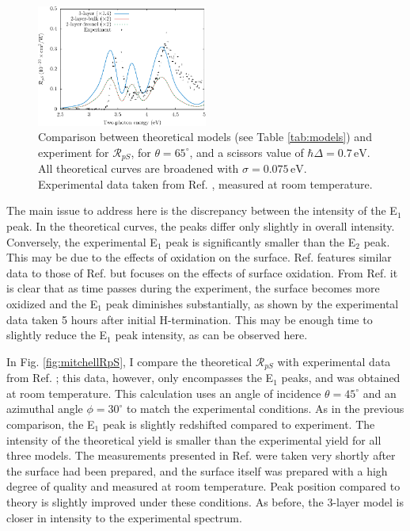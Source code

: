 \begin{figure}[H]
\centering
\includegraphics[width=0.5\textwidth]{content/figures/fig-4_4_01}
\caption{Comparison between theoretical models (see Table \ref{tab:models}) and
experiment for $\mathcal{R}_{pS}$, for $\theta=65^{\circ}$, and a scissors
value of $\hbar\Delta = 0.7\,\text{eV}$. All theoretical curves are broadened
with $\sigma=0.075\,\text{eV}$. Experimental data taken from Ref.
\cite{mejiaPRB02}, measured at room temperature.}
\label{fig:RpS}
\end{figure}

The main issue to address here is the discrepancy between the intensity of the
E$_{1}$ peak. In the theoretical curves, the peaks differ only slightly in
overall intensity. Conversely, the experimental E$_{1}$ peak is significantly
smaller than the E$_{2}$ peak. This may be due to the effects of oxidation on
the surface. Ref. \cite{bergfeldPRL04} features similar data to those of Ref.
\cite{mejiaPRB02} but focuses on the effects of surface oxidation. From Ref.
\cite{bergfeldPRL04} it is clear that as time passes during the experiment, the
surface becomes more oxidized and the E$_{1}$ peak diminishes substantially, as
shown by the experimental data taken 5 hours after initial H-termination. This
may be enough time to slightly reduce the E$_{1}$ peak intensity, as can be
observed here.

In Fig. \ref{fig:mitchellRpS}, I compare the theoretical $\mathcal{R}_{pS}$ with
experimental data from Ref. \cite{mitchellSS01}; this data, however, only
encompasses the E$_{1}$ peaks, and was obtained at room temperature. This
calculation uses an angle of incidence $\theta=45^\circ$ and an azimuthal angle
$\phi=30^\circ$ to match the experimental conditions. As in the previous
comparison, the E$_{1}$ peak is slightly redshifted compared to experiment. The
intensity of the theoretical yield is smaller than the experimental yield for
all three models. The measurements presented in Ref. \cite{mitchellSS01} were
taken very shortly after the surface had been prepared, and the surface itself
was prepared with a high degree of quality and measured at room temperature.
Peak position compared to theory is slightly improved under these conditions. As
before, the 3-layer model is closer in intensity to the experimental spectrum.

